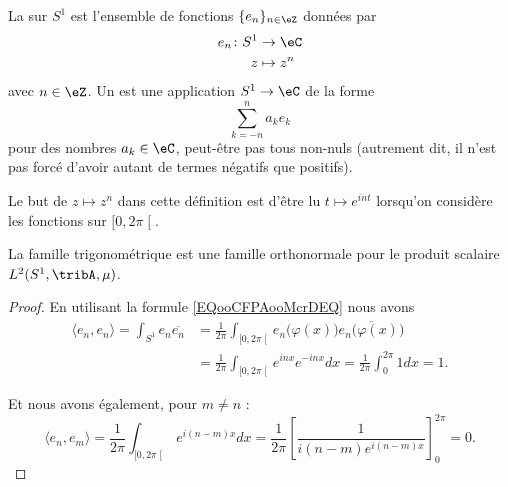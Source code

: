 \begin{definition}
    La  sur \( S^1\) est l'ensemble de fonctions \( \{ e_n \}_{n\in \eZ}\) données par
    \begin{equation}
        \begin{aligned}
            e_n\colon S^1&\to \eC \\
            z&\mapsto z^n
        \end{aligned}
    \end{equation}
    avec \( n\in \eZ\). Un  est une application \( S^1\to \eC\) de la forme
    \begin{equation}
        \sum_{k=-n}^na_ke_k
    \end{equation}
    pour des nombres \( a_k\in \eC\), peut-être pas tous non-nuls (autrement dit, il n'est pas forcé d'avoir autant de termes négatifs que positifs).
\end{definition}
Le but de \( z\mapsto z^n\) dans cette définition est d'être lu \(  t\mapsto e^{in t}\) lorsqu'on considère les fonctions sur \( \mathopen[ 0 , 2\pi \mathclose[\).

\begin{proposition}     \label{PROPooOMGFooROFFFr}
    La famille trigonométrique est une famille orthonormale pour le produit scalaire \( L^2(S^1,\tribA,\mu)\).
\end{proposition}

\begin{proof}
    En utilisant la formule \eqref{EQooCFPAooMcrDEQ} nous avons
    \begin{subequations}
        \begin{align}
            \langle e_n, e_n\rangle =\int_{S^1}e_n\overline{ e_n }&=\frac{1}{ 2\pi }\int_{\mathopen[ 0 , 2\pi \mathclose[}e_n\big( \varphi(x) \big)\overline{ e_n\big( \varphi(x) \big) }\\
                &=\frac{1}{ 2\pi }\int_{\mathopen[ 0 , 2\pi \mathclose[} e^{inx} e^{-inx}dx=\frac{1}{ 2\pi }\int_{0}^{2\pi}1dx=1.
        \end{align}
    \end{subequations}

    Et nous avons également, pour \( m\neq n\) :
    \begin{equation}
        \langle e_n, e_m\rangle =\frac{1}{ 2\pi }\int_{\mathopen[ 0 , 2\pi \mathclose[} e^{i(n-m)x}dx=\frac{1}{ 2\pi }\left[ \frac{1}{ i(n-m) e^{i(n-m)x} } \right]_0^{2\pi}=0.
    \end{equation}
\end{proof}


